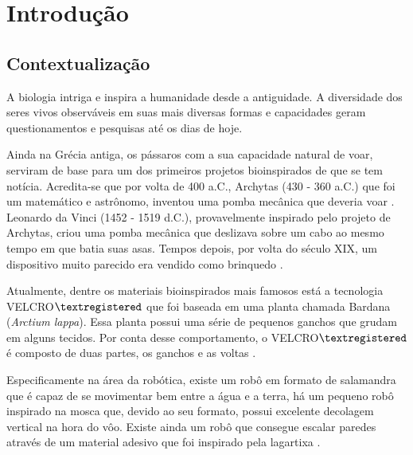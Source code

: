 \documentclass[
	12pt,				%
	openright,			%
	oneside,			%
	a4paper,			%
	english,			%
	brazil				%
	]{abntex2}
\begin{document}
\chapter{Introdução} %
		
		\section{Contextualização}


		A biologia intriga e inspira a humanidade desde a antiguidade. A diversidade dos seres vivos observáveis em suas mais diversas formas e capacidades geram questionamentos e pesquisas até os dias de hoje. 

		Ainda na Grécia antiga, os pássaros com a sua capacidade natural de voar, serviram de base para um dos primeiros projetos bioinspirados de que se tem notícia. Acredita-se que por volta de 400 a.C., Archytas (430 - 360 a.C.) que foi um matemático e astrônomo, inventou uma pomba mecânica que deveria voar \cite{livingstone2014greece}. Leonardo da Vinci (1452 - 1519 d.C.), provavelmente inspirado pelo projeto de Archytas, criou uma pomba mecânica que deslizava sobre um cabo ao mesmo tempo em que batia suas asas. Tempos depois, por volta do século XIX, um dispositivo muito parecido era vendido como brinquedo \cite{rosheim2006leonardo}.

		Atualmente, dentre os materiais bioinspirados mais famosos está a tecnologia VELCRO${\textregistered}$ que foi baseada em uma planta chamada Bardana (\textit{Arctium lappa}). Essa planta possui uma série de pequenos ganchos que grudam em alguns tecidos. Por conta desse comportamento, o VELCRO${\textregistered}$ é composto de duas partes, os ganchos e as voltas \cite{velcro2019about}. 
		
		Especificamente na área da robótica, existe um robô em formato de salamandra que é capaz de se movimentar bem entre a água e a terra, há um pequeno robô inspirado na mosca que, devido ao seu formato, possui excelente decolagem vertical na hora do vôo. Existe ainda um robô que consegue escalar paredes através de um material adesivo que foi inspirado pela lagartixa \cite{pfeifer2007biorobot}. 
\end{document}
